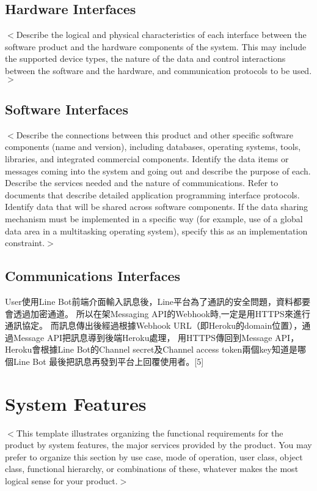 \documentclass{scrreprt}
\begin{document}
\section{Hardware Interfaces}
\begin{CJK}{UTF8}{<font>}
$<$Describe the logical and physical characteristics of each interface between 
the software product and the hardware components of the system. This may include 
the supported device types, the nature of the data and control interactions 
between the software and the hardware, and communication protocols to be 
used.$>$
\end{CJK}

\section{Software Interfaces}
\begin{CJK}{UTF8}{<font>}
$<$Describe the connections between this product and other specific software 
components (name and version), including databases, operating systems, tools, 
libraries, and integrated commercial components. Identify the data items or 
messages coming into the system and going out and describe the purpose of each.  
Describe the services needed and the nature of communications. Refer to 
documents that describe detailed application programming interface protocols.  
Identify data that will be shared across software components. If the data 
sharing mechanism must be implemented in a specific way (for example, use of a 
global data area in a multitasking operating system), specify this as an 
implementation constraint.$>$
\end{CJK}

\section{Communications Interfaces}
\begin{CJK}{UTF8}{<font>}
User使用Line Bot前端介面輸入訊息後，Line平台為了通訊的安全問題，資料都要會透過加密通道。
所以在架Messaging API的Webhook時,一定是用HTTPS來進行通訊協定。
而訊息傳出後經過根據Webhook URL（即Heroku的domain位置），通過Message API把訊息導到後端Heroku處理，
用HTTPS傳回到Message API，Heroku會根據Line Bot的Channel secret及Channel access token兩個key知道是哪個Line Bot
最後把訊息再發到平台上回覆使用者。[5]
\end{CJK}


\chapter{System Features}
\begin{CJK}{UTF8}{<font>}
$<$This template illustrates organizing the functional requirements for the 
product by system features, the major services provided by the product. You may 
prefer to organize this section by use case, mode of operation, user class, 
object class, functional hierarchy, or combinations of these, whatever makes the 
most logical sense for your product.$>$
\end{CJK}
\end{document}
